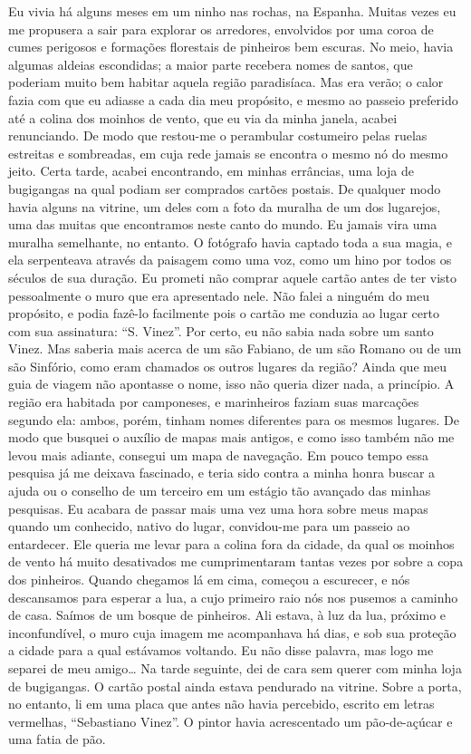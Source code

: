 Eu vivia há alguns meses em um ninho nas rochas, na Espanha. Muitas
vezes eu me propusera a sair para explorar os arredores, envolvidos por
uma coroa de cumes perigosos e formações florestais de pinheiros bem
escuras. No meio, havia algumas aldeias escondidas; a maior parte
recebera nomes de santos, que poderiam muito bem habitar aquela região
paradisíaca. Mas era verão; o calor fazia com que eu adiasse a cada dia
meu propósito, e mesmo ao passeio preferido até a colina dos moinhos de
vento, que eu via da minha janela, acabei renunciando. De modo que
restou-me o perambular costumeiro pelas ruelas estreitas e sombreadas,
em cuja rede jamais se encontra o mesmo nó do mesmo jeito. Certa tarde,
acabei encontrando, em minhas errâncias, uma loja de bugigangas na qual
podiam ser comprados cartões postais. De qualquer modo havia alguns na
vitrine, um deles com a foto da muralha de um dos lugarejos, uma das
muitas que encontramos neste canto do mundo. Eu jamais vira uma muralha
semelhante, no entanto. O fotógrafo havia captado toda a sua magia, e
ela serpenteava através da paisagem como uma voz, como um hino por todos
os séculos de sua duração. Eu prometi não comprar aquele cartão antes de
ter visto pessoalmente o muro que era apresentado nele. Não falei a
ninguém do meu propósito, e podia fazê-lo facilmente pois o cartão me
conduzia ao lugar certo com sua assinatura: ``S. Vinez''. Por certo, eu
não sabia nada sobre um santo Vinez. Mas saberia mais acerca de um são
Fabiano, de um são Romano ou de um são Sinfório, como eram chamados os
outros lugares da região? Ainda que meu guia de viagem não apontasse o
nome, isso não queria dizer nada, a princípio. A região era habitada por
camponeses, e marinheiros faziam suas marcações segundo ela: ambos,
porém, tinham nomes diferentes para os mesmos lugares. De modo que
busquei o auxílio de mapas mais antigos, e como isso também não me levou
mais adiante, consegui um mapa de navegação. Em pouco tempo essa
pesquisa já me deixava fascinado, e teria sido contra a minha honra
buscar a ajuda ou o conselho de um terceiro em um estágio tão avançado
das minhas pesquisas. Eu acabara de passar mais uma vez uma hora sobre
meus mapas quando um conhecido, nativo do lugar, convidou-me para um
passeio ao entardecer. Ele queria me levar para a colina fora da cidade,
da qual os moinhos de vento há muito desativados me cumprimentaram
tantas vezes por sobre a copa dos pinheiros. Quando chegamos lá em cima,
começou a escurecer, e nós descansamos para esperar a lua, a cujo
primeiro raio nós nos pusemos a caminho de casa. Saímos de um bosque de
pinheiros. Ali estava, à luz da lua, próximo e inconfundível, o muro
cuja imagem me acompanhava há dias, e sob sua proteção a cidade para a
qual estávamos voltando. Eu não disse palavra, mas logo me separei de
meu amigo\ldots{} Na tarde seguinte, dei de cara sem querer com minha loja de
bugigangas. O cartão postal ainda estava pendurado na vitrine. Sobre a
porta, no entanto, li em uma placa que antes não havia percebido,
escrito em letras vermelhas, ``Sebastiano Vinez''. O pintor havia
acrescentado um pão-de-açúcar e uma fatia de pão.

